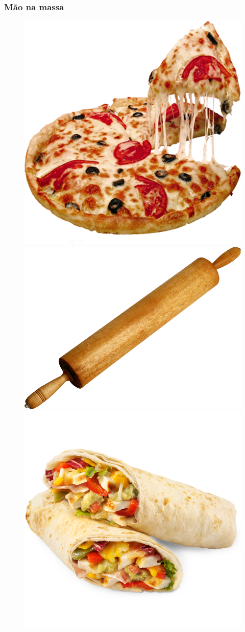 \documentclass[12pt]{beamer}
\begin{document}
\begin{frame}
    \frametitle{Mão na massa}
    \begin{figure}
        \centering
        \includegraphics[width=.3\textwidth]{pizza.png}
        \includegraphics[width=.3\textwidth]{rolo.png}
        \includegraphics[width=.3\textwidth]{burrito.png}
    \end{figure}
\end{frame}
\end{document}
